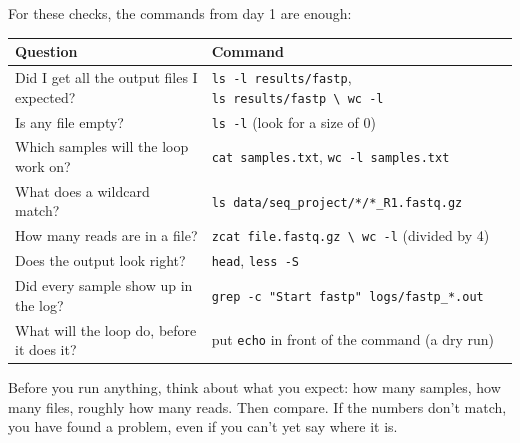 \documentclass[
  letterpaper,
  DIV=11,
  numbers=noendperiod]{scrreprt}
\begin{document}
For these checks, the commands from day 1 are enough:

\begin{longtable}[]{@{}
  >{\raggedright\arraybackslash}p{}
  >{\raggedright\arraybackslash}p{}@{}}
\toprule\noalign{}
\begin{minipage}[b]{\linewidth}\raggedright
Question
\end{minipage} & \begin{minipage}[b]{\linewidth}\raggedright
Command
\end{minipage} \\
\midrule\noalign{}
\endhead
\bottomrule\noalign{}
\endlastfoot
Did I get all the output files I expected? &
\texttt{ls\ -l\ results/fastp},
\texttt{ls\ results/fastp\ \textbackslash{}\textbar{}\ wc\ -l} \\
Is any file empty? & \texttt{ls\ -l} (look for a size of 0) \\
Which samples will the loop work on? & \texttt{cat\ samples.txt},
\texttt{wc\ -l\ samples.txt} \\
What does a wildcard match? &
\texttt{ls\ data/seq\_project/*/*\_R1.fastq.gz} \\
How many reads are in a file? &
\texttt{zcat\ file.fastq.gz\ \textbackslash{}\textbar{}\ wc\ -l}
(divided by 4) \\
Does the output look right? & \texttt{head}, \texttt{less\ -S} \\
Did every sample show up in the log? &
\texttt{grep\ -c\ "Start\ fastp"\ logs/fastp\_*.out} \\
What will the loop do, before it does it? & put \texttt{echo} in front
of the command (a dry run) \\
\end{longtable}

Before you run anything, think about what you expect: how many samples,
how many files, roughly how many reads. Then compare. If the numbers
don't match, you have found a problem, even if you can't yet say where
it is.
\end{document}
